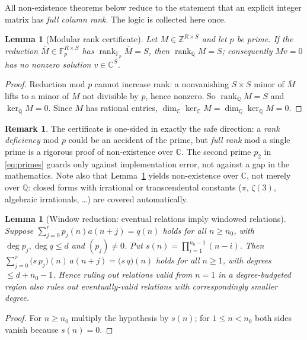 \documentclass[11pt]{article}
\newtheorem{lemma}[theorem]{Lemma}
\theoremstyle{definition}
\newtheorem{remark}[theorem]{Remark}
\DeclareMathOperator{\rank}{rank}
\DeclareMathOperator{\Ker}{ker}
\newcommand{\ZZ}{\mathbb{Z}}
\newcommand{\QQ}{\mathbb{Q}}
\newcommand{\CC}{\mathbb{C}}
\newcommand{\FF}{\mathbb{F}}
\begin{document}
All non-existence theorems below reduce to the statement that an explicit
integer matrix has \emph{full column rank}. The logic is collected here once.

\begin{lemma}[Modular rank certificate]\label{lem:rank}
Let $M\in\ZZ^{R\times S}$ and let $p$ be prime. If the reduction
$\overline{M}\in\FF_p^{R\times S}$ has $\rank_{\FF_p}\overline{M}=S$, then
$\rank_\QQ M=S$; consequently $Mv=0$ has no nonzero solution $v\in\CC^{S}$.
\end{lemma}

\begin{proof}
Reduction mod $p$ cannot increase rank: a nonvanishing $S\times S$ minor of
$\overline M$ lifts to a minor of $M$ not divisible by $p$, hence nonzero. So
$\rank_\QQ M = S$ and $\Ker_\QQ M=0$. Since $M$ has rational entries,
$\dim_\CC\Ker_\CC M=\dim_\QQ\Ker_\QQ M=0$.
\end{proof}

\begin{remark}\label{rem:onesided}
The certificate is one-sided in exactly the safe direction: a \emph{rank
deficiency} mod $p$ could be an accident of the prime, but \emph{full rank} mod a
single prime is a rigorous proof of non-existence over $\CC$. The second prime
$p_2$ in \eqref{eq:primes} guards only against implementation error, not against
a gap in the mathematics. Note also that Lemma~\ref{lem:rank} yields
non-existence over $\CC$, not merely over $\QQ$: closed forms with irrational or
transcendental constants ($\pi$, $\zeta(3)$, algebraic irrationals, \dots) are
covered automatically.
\end{remark}

\begin{lemma}[Window reduction: eventual relations imply windowed relations]
\label{lem:window}
Suppose $\sum_{j=0}^{r}p_j(n)a(n+j)=q(n)$ holds for all $n\ge n_0$, with
$\deg p_j,\deg q\le d$ and $(p_j)\neq0$. Put
$s(n)=\prod_{i=1}^{n_0-1}(n-i)$. Then
$\sum_{j=0}^{r}\bigl(s\,p_j\bigr)(n)\,a(n+j)=\bigl(s\,q\bigr)(n)$ holds for
\emph{all} $n\ge1$, with degrees $\le d+n_0-1$. Hence ruling out relations valid
from $n=1$ in a degree-budgeted region also rules out eventually-valid relations
with correspondingly smaller degree.
\end{lemma}

\begin{proof}
For $n\ge n_0$ multiply the hypothesis by $s(n)$; for $1\le n<n_0$ both sides
vanish because $s(n)=0$.
\end{proof}
\end{document}
